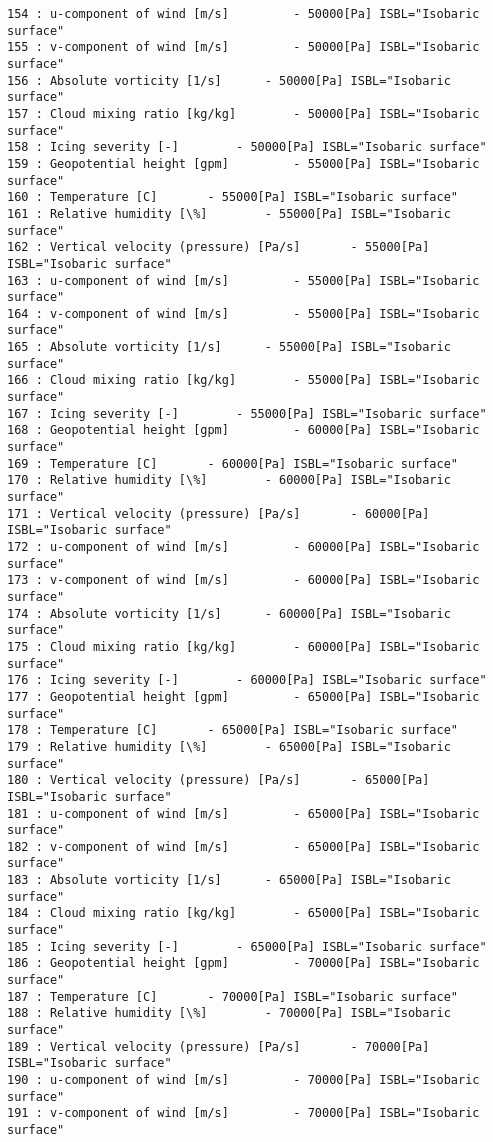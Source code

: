 \documentclass[11pt]{article}
\begin{document}
\begin{Verbatim}[commandchars=\\\{\}]
154 : u-component of wind [m/s] 		- 50000[Pa] ISBL="Isobaric surface"
155 : v-component of wind [m/s] 		- 50000[Pa] ISBL="Isobaric surface"
156 : Absolute vorticity [1/s] 		- 50000[Pa] ISBL="Isobaric surface"
157 : Cloud mixing ratio [kg/kg] 		- 50000[Pa] ISBL="Isobaric surface"
158 : Icing severity [-] 		- 50000[Pa] ISBL="Isobaric surface"
159 : Geopotential height [gpm] 		- 55000[Pa] ISBL="Isobaric surface"
160 : Temperature [C] 		- 55000[Pa] ISBL="Isobaric surface"
161 : Relative humidity [\%] 		- 55000[Pa] ISBL="Isobaric surface"
162 : Vertical velocity (pressure) [Pa/s] 		- 55000[Pa] ISBL="Isobaric surface"
163 : u-component of wind [m/s] 		- 55000[Pa] ISBL="Isobaric surface"
164 : v-component of wind [m/s] 		- 55000[Pa] ISBL="Isobaric surface"
165 : Absolute vorticity [1/s] 		- 55000[Pa] ISBL="Isobaric surface"
166 : Cloud mixing ratio [kg/kg] 		- 55000[Pa] ISBL="Isobaric surface"
167 : Icing severity [-] 		- 55000[Pa] ISBL="Isobaric surface"
168 : Geopotential height [gpm] 		- 60000[Pa] ISBL="Isobaric surface"
169 : Temperature [C] 		- 60000[Pa] ISBL="Isobaric surface"
170 : Relative humidity [\%] 		- 60000[Pa] ISBL="Isobaric surface"
171 : Vertical velocity (pressure) [Pa/s] 		- 60000[Pa] ISBL="Isobaric surface"
172 : u-component of wind [m/s] 		- 60000[Pa] ISBL="Isobaric surface"
173 : v-component of wind [m/s] 		- 60000[Pa] ISBL="Isobaric surface"
174 : Absolute vorticity [1/s] 		- 60000[Pa] ISBL="Isobaric surface"
175 : Cloud mixing ratio [kg/kg] 		- 60000[Pa] ISBL="Isobaric surface"
176 : Icing severity [-] 		- 60000[Pa] ISBL="Isobaric surface"
177 : Geopotential height [gpm] 		- 65000[Pa] ISBL="Isobaric surface"
178 : Temperature [C] 		- 65000[Pa] ISBL="Isobaric surface"
179 : Relative humidity [\%] 		- 65000[Pa] ISBL="Isobaric surface"
180 : Vertical velocity (pressure) [Pa/s] 		- 65000[Pa] ISBL="Isobaric surface"
181 : u-component of wind [m/s] 		- 65000[Pa] ISBL="Isobaric surface"
182 : v-component of wind [m/s] 		- 65000[Pa] ISBL="Isobaric surface"
183 : Absolute vorticity [1/s] 		- 65000[Pa] ISBL="Isobaric surface"
184 : Cloud mixing ratio [kg/kg] 		- 65000[Pa] ISBL="Isobaric surface"
185 : Icing severity [-] 		- 65000[Pa] ISBL="Isobaric surface"
186 : Geopotential height [gpm] 		- 70000[Pa] ISBL="Isobaric surface"
187 : Temperature [C] 		- 70000[Pa] ISBL="Isobaric surface"
188 : Relative humidity [\%] 		- 70000[Pa] ISBL="Isobaric surface"
189 : Vertical velocity (pressure) [Pa/s] 		- 70000[Pa] ISBL="Isobaric surface"
190 : u-component of wind [m/s] 		- 70000[Pa] ISBL="Isobaric surface"
191 : v-component of wind [m/s] 		- 70000[Pa] ISBL="Isobaric surface"

\end{Verbatim}
\end{document}
